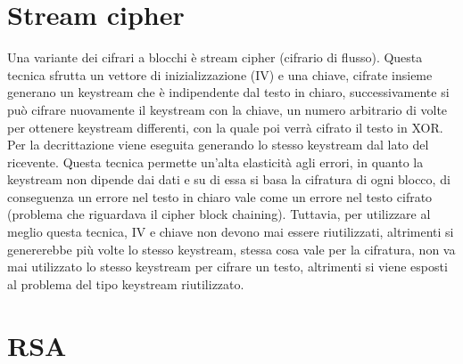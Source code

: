 \section{Stream cipher}

Una variante dei cifrari a blocchi è stream cipher (cifrario di flusso).
Questa tecnica sfrutta un vettore di inizializzazione (IV) e una chiave, cifrate insieme generano un keystream che è indipendente dal testo in chiaro, successivamente si può cifrare nuovamente il keystream con la chiave, un numero arbitrario di volte per ottenere keystream differenti, con la quale poi verrà cifrato il testo in XOR.
Per la decrittazione viene eseguita generando lo stesso keystream dal lato del ricevente.
Questa tecnica permette un’alta elasticità agli errori, in quanto la keystream non dipende dai dati e su di essa si basa la cifratura di ogni blocco, di conseguenza un errore nel testo in chiaro vale come un errore nel testo cifrato (problema che riguardava il cipher block chaining).
Tuttavia, per utilizzare al meglio questa tecnica, IV e chiave non devono mai essere riutilizzati, altrimenti si genererebbe più volte lo stesso keystream, stessa cosa vale per la cifratura, non va mai utilizzato lo stesso keystream per cifrare un testo, altrimenti si viene esposti al problema del tipo keystream riutilizzato.

 
\section{RSA}

